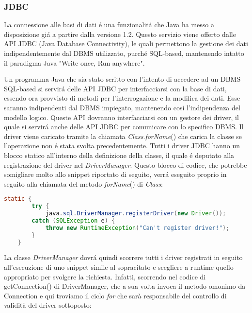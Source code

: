 \documentclass[12pt,a4paper,onecolumn,x11names]{article}
\begin{document}
	\subsubsection{JDBC}
		\begin{flushleft}
				La connessione alle basi di dati \'{e} una funzionalit\'{a} che Java ha messo a disposizione gi\'{a} a partire dalla versione 1.2. Questo servizio viene offerto dalle API JDBC (Java Database Connectivity), le quali permettono la gestione dei dati indipendentemente dal DBMS utilizzato, purch\'{e} SQL-based, mantenendo intatto il paradigma Java "Write once, Run anywhere".\newline
				
				Un programma Java che sia stato scritto con l'intento di accedere ad un DBMS SQL-based si servir\'{a} delle API JDBC per interfacciarsi con la base di dati, essendo ora provvisto di metodi per l'interrogazione e la modifica dei dati. Esse saranno indipendenti dal DBMS impiegato, mantenendo cos\'{i} l'indipendenza del modello logico.\newline
				Queste API dovranno interfacciarsi con un gestore dei driver, il quale si servir\'{a} anche delle API JDBC per comunicare con lo specifico DBMS.
				Il driver viene caricato tramite la chiamata \textit{Class}.\textit{forName}() che carica la classe se l'operazione non \'{e} stata svolta precedentemente. Tutti i driver JDBC hanno un blocco statico all'interno della definizione della classe, il quale \'{e} deputato alla registrazione del driver nel \textit{DriverManager}. Questo blocco di codice, che potrebbe somigliare molto allo snippet riportato di seguito, verr\'{a} eseguito proprio in seguito alla chiamata del metodo \textit{forName}() di \textit{Class}:
		\end{flushleft}
		\begin{lstlisting}[language=java, caption=Snippet da \cite{JDBCDriver}]
	static { 
		try {
			java.sql.DriverManager.registerDriver(new Driver());
		catch (SQLException e) {
			throw new RuntimeException("Can't register driver!");
		}
	}
		\end{lstlisting}
	\begin{flushleft}
		La classe \textit{DriverManager} dovr\'{a} quindi scorrere tutti i driver registrati in seguito all'esecuzione di uno snippet simile al sopracitato e scegliere a runtime quello appropriato per svolgere la richiesta. Infatti, scorrendo nel codice di \textsf{getConnection()} di \textsf{DriverManager}, che a sua volta invoca il metodo omonimo da \textsf{Connection} e qui troviamo il ciclo \textit{for} che sarà responsabile del controllo di validità del driver sottoposto:\newline
	\end{flushleft}
					
\end{document}
